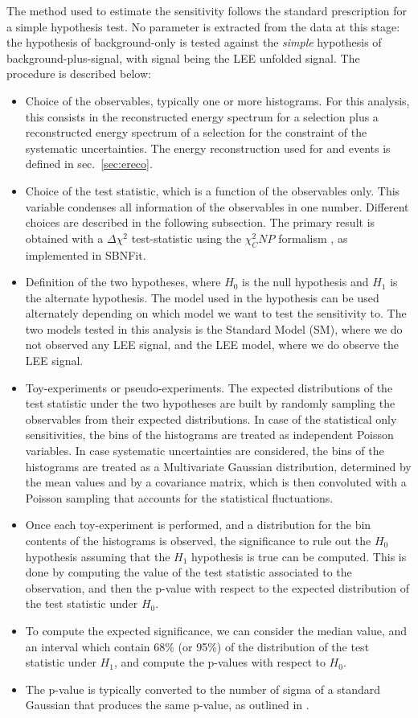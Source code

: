 The method used to estimate the sensitivity follows the standard prescription for a simple hypothesis test.
No parameter is extracted from the data at this stage: the hypothesis of background-only is tested against the \textit{simple} hypothesis of background-plus-signal, with signal being the LEE unfolded signal.
The procedure is described below:
\begin{itemize}
    \item Choice of the observables, typically one or more histograms. For this analysis, this consists in the reconstructed energy spectrum for a \nue selection plus a reconstructed energy spectrum of a \numu selection for the constraint of the systematic uncertainties. The energy reconstruction used for \nue and \numu events is defined in sec.~\ref{sec:ereco}. 
    \item Choice of the test statistic, which is a function of the observables only. This variable condenses all information of the observables in one number. Different choices are described in the following subsection. The primary result is obtained with a $\Delta\chi^2$ test-statistic using the $\chi^2_CNP$ formalism \cite{bib:Ji_2020}, as implemented in SBNFit.
    \item Definition of the two hypotheses, where $H_0$ is the null hypothesis and $H_1$ is the alternate hypothesis. The model used in the hypothesis can be used alternately depending on which model we want to test the sensitivity to. The two models tested in this analysis is the Standard Model (SM), where we do not observed any LEE signal, and the LEE model, where we do observe the LEE signal.
    \item Toy-experiments or pseudo-experiments. The expected distributions of the test statistic under the two hypotheses are built by randomly sampling the observables from their expected distributions. In case of the statistical only sensitivities, the bins of the histograms are treated as independent Poisson variables. In case systematic uncertainties are considered, the bins of the histograms are treated as a Multivariate Gaussian distribution, determined by the mean values and by a covariance matrix, which is then convoluted with a Poisson sampling that accounts for the statistical fluctuations.
    \item Once each toy-experiment is performed, and a distribution for the bin contents of the histograms is observed, the significance to rule out the $H_0$ hypothesis assuming that the $H_1$ hypothesis is true can be computed. This is done by computing the value of the test statistic associated to the observation, and then the p-value with respect to the expected distribution of the test statistic under $H_0$.
    \item To compute the expected significance, we can consider the median value, and an interval which contain 68\% (or 95\%) of the distribution of the test statistic under $H_1$, and compute the p-values with respect to $H_0$.
    \item The p-value is typically converted to the number of sigma of a standard Gaussian that produces the same p-value, as outlined in \cite{bib:cowan}.
\end{itemize}

